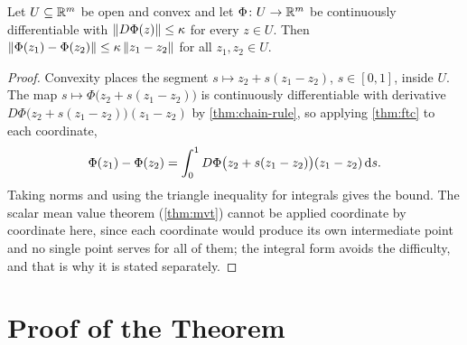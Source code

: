 \begin{lemma}\label{lem:mvi}
	Let $U\subseteq\mathbb{R}^{m}$ be open and convex and let $\Phi\colon U\to\mathbb{R}^{m}$ be
	continuously differentiable with $\left\lVert D\Phi(z)\right\rVert\leq\kappa$ for every $z\in U$.
	Then $\left\lVert\Phi(z_1)-\Phi(z_2)\right\rVert\leq\kappa\left\lVert z_1-z_2\right\rVert$ for all
	$z_1,z_2\in U$.
\end{lemma}

\begin{proof}
	Convexity places the segment $s\mapsto z_2+s(z_1-z_2)$, $s\in[0,1]$, inside $U$.
	The map $s\mapsto\Phi\bigl(z_2+s(z_1-z_2)\bigr)$ is continuously differentiable
	with derivative $D\Phi\bigl(z_2+s(z_1-z_2)\bigr)(z_1-z_2)$ by
	\autoref{thm:chain-rule}, so applying \autoref{thm:ftc} to each coordinate,
	\[
		\Phi(z_1)-\Phi(z_2)
		=\int_{0}^{1}D\Phi\bigl(z_2+s(z_1-z_2)\bigr)(z_1-z_2)\,\mathrm{d} s .
	\]
	Taking norms and using the triangle inequality for integrals gives the bound.
	The scalar mean value theorem (\autoref{thm:mvt}) cannot be applied coordinate
	by coordinate here, since each coordinate would produce its own intermediate
	point and no single point serves for all of them; the integral form avoids the
	difficulty, and that is why it is stated separately.
\end{proof}

\section{Proof of the Theorem}\label{sec:app-ift-proof}

